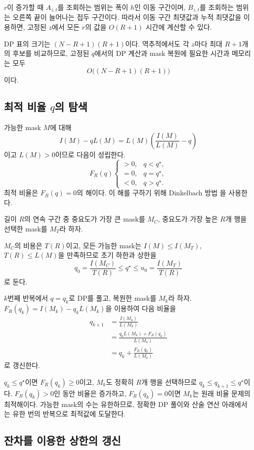 $r$이 증가할 때 $A_{z,t}$를 조회하는 범위는 폭이 $h$인 이동 구간이며, $B_{z,t}$를 조회하는 범위는 오른쪽 끝이 늘어나는 접두 구간이다. 따라서 이동 구간 최댓값과 누적 최댓값을 이용하면, 고정된 $z$에서 모든 $r$의 값을 $O(R+1)$ 시간에 계산할 수 있다.

DP 표의 크기는 $(N-R+1)(R+1)$이다. 역추적에서도 각 $z$마다 최대 $R+1$개의 후보를 비교하므로, 고정된 $q$에서의 DP 계산과 mask 복원에 필요한 시간과 메모리는 모두
\[
O\bigl((N-R+1)(R+1)\bigr)
\]
이다.

\subsection{최적 비율 \texorpdfstring{$q$}{q}의 탐색}\label{sec:dinkelbach}

가능한 mask $M$에 대해
\[
I(M)-qL(M)
=L(M)\left(\frac{I(M)}{L(M)}-q\right)
\]
이고 $L(M)>0$이므로 다음이 성립한다.
\[
F_R(q)
\begin{cases}
>0,&q<q^\star,\\
=0,&q=q^\star,\\
<0,&q>q^\star.
\end{cases}
\]
최적 비율은 $F_R(q)=0$의 해이다. 이 해를 구하기 위해 Dinkelbach 방법 \cite{dinkelbach1967}을 사용한다.

길이 $R$의 연속 구간 중 중요도가 가장 큰 mask를 $M_C$, 중요도가 가장 높은 $R$개 행을 선택한 mask를 $M_T$라 하자.

$M_C$의 비용은 $T(R)$이고, 모든 가능한 mask는 $I(M)\le I(M_T)$, $T(R)\le L(M)$을 만족하므로 초기 하한과 상한을
\[
q_0=\frac{I(M_C)}{T(R)}
\le q^\star\le
u_0=\frac{I(M_T)}{T(R)}
\]
로 둔다.

$k$번째 반복에서 $q=q_k$로 DP를 풀고, 복원한 mask를 $M_k$라 하자. $F_R(q_k)=I(M_k)-q_kL(M_k)$을 이용하여 다음 비율을
\[
\boxed{
\begin{aligned}
q_{k+1}
&=\frac{I(M_k)}{L(M_k)}\\
&=\frac{q_kL(M_k)+F_R(q_k)}{L(M_k)}\\
&=q_k+\frac{F_R(q_k)}{L(M_k)}
\end{aligned}
}
\]
로 갱신한다.

$q_k\le q^\star$이면 $F_R(q_k)\ge0$이고, $M_k$도 정확히 $R$개 행을 선택하므로 $q_k\le q_{k+1}\le q^\star$이다. $F_R(q_k)>0$인 동안 비율은 증가하고, $F_R(q_k)=0$이면 $M_k$는 원래 비율 문제의 최적해이다. 가능한 mask의 수는 유한하므로, 정확한 DP 풀이와 산술 연산 아래에서는 유한 번의 반복으로 최적값에 도달한다.

\subsection{잔차를 이용한 상한의 갱신}\label{sec:upper-bound}

